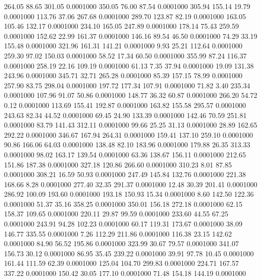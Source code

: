  264.05   88.65  301.05   0.0001000
 350.05   76.00   87.54   0.0001000
 305.94  155.14   19.79   0.0001000
 113.76   37.06  267.68   0.0001000
 289.70  123.87   82.19   0.0001000
 163.05  105.46  132.17   0.0001000
 234.10  165.05  247.89   0.0001000
 178.14   75.43  259.59   0.0001000
 152.62   22.99  161.37   0.0001000
 146.16   89.54   46.50   0.0001000
  74.29   33.19  155.48   0.0001000
 321.96  161.31  141.21   0.0001000
   9.93   25.21  112.64   0.0001000
 259.30   97.02  150.03   0.0001000
  58.52   17.34   60.50   0.0001000
 355.99   87.24  116.37   0.0001000
 258.19   22.16  109.19   0.0001000
  61.13    7.35   37.94   0.0001000
  19.09  131.38  243.96   0.0001000
 345.71   32.71  265.28   0.0001000
  85.39  157.15   78.99   0.0001000
 257.90   83.75  298.04   0.0001000
 197.72  177.34  107.91   0.0001000
  71.82    3.40  235.34   0.0001000
 107.96   91.07   50.86   0.0001000
 148.77   36.32   60.87   0.0001000
 266.20   54.72    0.12   0.0001000
 113.69  155.41  192.87   0.0001000
 163.82  155.58  295.57   0.0001000
 243.63   82.34   44.52   0.0001000
  69.45   24.90  133.39   0.0001000
 142.46   70.59  251.81   0.0001000
  83.79  141.43  312.11   0.0001000
  99.66   25.25   31.13   0.0001000
  28.89  162.65  292.22   0.0001000
 346.67  167.94  264.31   0.0001000
 159.41  137.10  259.10   0.0001000
  90.86  166.06   64.03   0.0001000
 138.48   82.10  183.96   0.0001000
 179.88   26.35  313.33   0.0001000
  98.02  163.17  139.54   0.0001000
  63.36  138.67  156.11   0.0001000
 212.65  151.86  187.38   0.0001000
 327.18  120.86  266.60   0.0001000
 310.23    8.01   87.85   0.0001000
 308.21   16.59   50.93   0.0001000
 247.49  145.84  132.76   0.0001000
 221.38  168.66    8.28   0.0001000
 277.40   32.35  291.37   0.0001000
  12.48   30.39  201.41   0.0001000
 286.92  100.09  193.60   0.0001000
 193.18  150.93   15.34   0.0001000
   8.60  142.50  122.36   0.0001000
  51.37   35.16  358.25   0.0001000
 350.01  156.18  272.18   0.0001000
  62.15  158.37  109.65   0.0001000
 220.11   29.87   99.59   0.0001000
 233.60   44.55   67.25   0.0001000
 243.91   94.28  102.23   0.0001000
  60.17  119.31  173.67   0.0001000
  38.09  146.77  335.55   0.0001000
   7.26  112.29  211.86   0.0001000
 116.38   23.15  142.62   0.0001000
  84.90   56.52  195.86   0.0001000
 323.99   30.67   79.57   0.0001000
 341.07  156.73   30.12   0.0001000
  86.95   35.45  239.22   0.0001000
  39.91   97.78   10.45   0.0001000
 161.44  111.59   62.39   0.0001000
 125.04  104.70  299.83   0.0001000
 224.71  167.57  337.22   0.0001000
 150.42   30.05  177.10   0.0001000
  71.48  154.18  144.19   0.0001000

